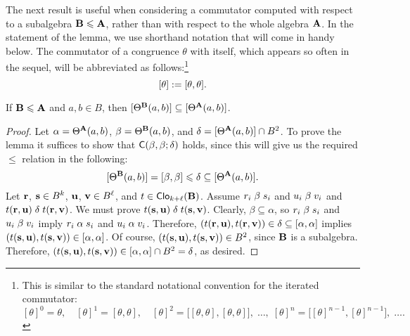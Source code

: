 The next result is useful when considering a commutator computed
with respect to a subalgebra $\mathbf{B} \leqslant \mathbf{A}$, rather than with respect to the
whole algebra $\mathbf{A}$.
In the statement of the lemma, we use shorthand notation that will come in handy below.
The commutator %
of a congruence $\theta$ with itself, which appears so often in the sequel,
will be abbreviated as follows:\footnote{This is similar to the standard notational convention
  for the iterated commutator:
  \[
    [\theta]^0 =  \theta, \quad
    [\theta]^1 =  [\theta, \theta],  \quad
    [\theta]^2 =  \bigl[[\theta, \theta],[\theta, \theta]\bigr],  \; \dots, \;
    [\theta]^n =  \bigl[[\theta]^{n-1}, [\theta]^{n-1}\bigr], \; \dots.
    \]
}
\[
[\theta]:= [\theta, \theta].
\]



\begin{lem}
\label{lem:subalgebra-comm}
If $\mathbf{B} \leqslant \mathbf{A}$ and $a, b \in B$, then
$[\Theta^{\mathbf{B}} (a, b)] \subseteq [\Theta^{\mathbf{A}} (a, b)]$. %
\end{lem}
\begin{proof}
  Let $\alpha = \Theta^{\mathbf{A}} (a, b)$, $\beta = \Theta^{\mathbf{B}} (a, b)$, and
  $\delta=[\Theta^{\mathbf{A}} (a, b)] \cap B^2$.
  To prove the lemma it suffices to show that
  $\mathsf{C}(\beta, \beta; \delta)$ holds, since this will give us
  the required $\leq$ relation in the following:
  \[[\Theta^{\mathbf{B}}(a,b)] = [\beta, \beta] \leqslant \delta \subseteq [\Theta^{\mathbf{A}}(a,b)].\]
  Let $\mathbf{r}$, $\mathbf{s} \in B^{k}$,
  $\mathbf{u}$, $\mathbf{v} \in B^{\ell}$, and $t\in \operatorname{\mathsf{Clo}}_{k+\ell}(\mathbf{B})$.
  Assume $r_i \mathrel{\beta} s_i$ and $u_i \mathrel{\beta} v_i$ and $t(\mathbf{r}, \mathbf{u}) \mathrel{\delta} t(\mathbf{r}, \mathbf{v})$.
  We must prove $t(\mathbf{s}, \mathbf{u}) \mathrel{\delta} t(\mathbf{s}, \mathbf{v})$.
  Clearly, $\beta \subseteq \alpha$, so $r_i \mathrel{\beta} s_i$ and $u_i \mathrel{\beta} v_i$ imply
  $r_i \mathrel{\alpha} s_i$ and $u_i \mathrel{\alpha} v_i$.  Therefore,
  $(t(\br, \bu), t(\br, \bv)) \in \delta  %
  \subseteq \com{\alpha}$ implies
  $(t(\mathbf{s}, \mathbf{u}), t(\mathbf{s}, \mathbf{v})) \in [\alpha, \alpha]$.
  Of course, $(t(\mathbf{s}, \mathbf{u}), t(\mathbf{s}, \mathbf{v})) \in B^2$, since $\mathbf{B}$ is a subalgebra.
  Therefore, $(t(\mathbf{s}, \mathbf{u}), t(\mathbf{s}, \mathbf{v})) \in [\alpha, \alpha]\cap B^2 = \delta$, as desired.
\end{proof}



